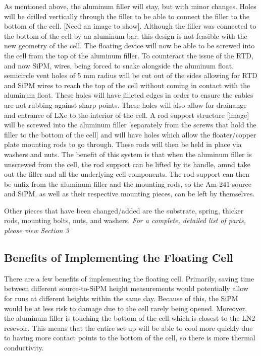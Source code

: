 \documentclass{article}%
\begin{document}
As mentioned above, the aluminum filler will stay, but with minor changes. Holes will be drilled vertically through the filler to be able to connect the filler to the bottom of the cell. [Need an image to show]. Although the filler was connected to the bottom of the cell by an aluminum bar, this design is not feasible with the new geometry of the cell. The floating device will now be able to be screwed into the cell from the top of the aluminum filler. To counteract the issue of the RTD, and now SiPM, wires, being forced to snake alongside the aluminum float, semicircle vent holes of 5 mm radius will be cut out of the sides allowing for RTD and SiPM wires to reach the top of the cell without coming in contact with the aluminum float. These holes will have filleted edges in order to ensure the cables are not rubbing against sharp points. These holes will also allow for drainange and entrance of LXe to the interior of the cell. A rod support structure [image] will be screwed into the aluminum filler [separately from the screws that hold the filler to the bottom of the cell] and will have holes which allow the floater/copper plate mounting rods to go through. These rods will then be held in place via washers and nuts. The benefit of this system is that when the aluminum filler is unscrewed from the cell, the rod support can be lifted by its handle, amnd take out the filler and all the underlying cell components. The rod support can then be unfix from the aluminum filler and the mounting rods, so the Am-241 source and SiPM, as well as their respective mounting pieces, can be left by themselves. 

Other pieces that have been changed/added are the substrate, spring, thicker rods, mounting bolts, nuts, and washers. \textit{For a complete, detailed list of parts, please view Section 3}

\subsection{Benefits of Implementing the Floating Cell}
There are a few benefits of implementing the floating cell. Primarily, saving time between different source-to-SiPM height measurements would potentially allow for runs at different heights within the same day. Because of this, the SiPM would be at less risk to damage due to the cell rarely being opened. Moreover, the aluminum filler is touching the bottom of the cell which is closest to the LN2 resevoir. This means that the entire set up will be able to cool more quickly due to having more contact points to the bottom of the cell, so there is more thermal conductivity. 
\end{document}
